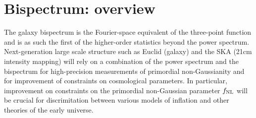 \chapter{Bispectrum: overview}
\label{chapter:introbisp}


The galaxy bispectrum is the Fourier-space equivalent of the three-point function and is as such the first of the higher-order statistics beyond the power spectrum. Next-generation large scale structure such as Euclid (galaxy) and the SKA (21cm intensity mapping) will rely on a combination of the power spectrum and the bispectrum for high-precision measurements of primordial non-Gaussianity and for improvement of constraints on cosmological parameters. In particular, improvement on constraints on the primordial non-Gaussian parameter $f_\text{NL}$ will be crucial for discrimitation between various models of inflation and other theories of the early universe. 